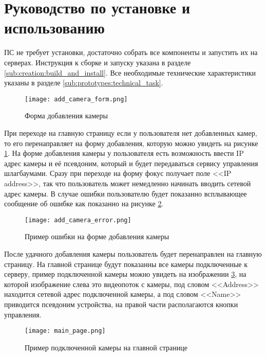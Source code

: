 \section{Руководство по установке и использованию} 
\label{sec:user_guide}

ПС не требует установки, достаточно собрать все компоненты и запустить их на серверах. Инструкция к сборке и запуску указана в разделе \ref{sub:creation:build_and_install}.
Все необходимые технические характеристики указаны в разделе \ref{sub:prototypes:technical_task}.

\begin{figure}[ht]
  \centering
  \texttt{[image: add\_camera\_form.png]} 
  \caption{Форма добавления камеры} 
  \label{sec:user_guide:add_camera}
\end{figure}

При переходе на главную страницу если у пользователя нет добавленных камер, то его перенаправляет на форму добавления, которую можно увидеть на рисунке \ref{sec:user_guide:add_camera}. На форме добавления камеры у пользователя есть возможность ввести IP адрес камеры и её псевдоним, который и будет передаваться сервису управления шлагбаумами. Сразу при переходе на форму фокус получает поле <<IP address>>, так что пользователь может немедленно начинать вводить сетевой адрес камеры. В случае ошибки пользователю будет показанно всплывающее сообщение об ошибке как показанно на рисунке \ref{sec:user_guide:add_camera_error}.

\begin{figure}[ht]
  \centering
  \texttt{[image: add\_camera\_error.png]} 
  \caption{Пример ошибки на форме добавления камеры} 
  \label{sec:user_guide:add_camera_error}
\end{figure}

После удачного добавления камеры пользователь будет перенаправлен на главную страницу. На главной странице будут показанны все камеры подключенные к серверу, пример подключенной камеры можно увидеть на изображении \ref{sec:user_guide:main_page_camera}, на которой изображение слева это видеопоток с камеры, под словом <<Address>> находится сетевой адрес подключенной камеры, а под словом <<Name>> приводится псевдоним устройства, на правой части располагаются кнопки управления. 

\begin{figure}[ht]
  \centering
  \texttt{[image: main\_page.png]} 
  \caption{Пример подключенной камеры на главной странице} 
  \label{sec:user_guide:main_page_camera}
\end{figure}

